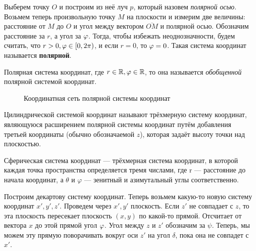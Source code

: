 	\Pagebreak

	\begin{Def}
		Выберем точку $O$ и построим из неё луч $p$, который назовем \textit{полярной осью}. Возьмем теперь произвольную точку $M$ на плоскости и измерим две величины:
		расстояние от $M$ до $O$ и угол между вектором $\overline{OM}$ и полярной осью. Обозначим расстояние за $r$, а угол за $\varphi$.
		Тогда, чтобы избежать неоднозначности, будем считать, что $r > 0, \varphi \in [0, 2\pi)$, и если $r = 0$, то $\varphi = 0$.    
		Такая система координат называется \textbf{полярной}.		

		\begin{figure*}[h]
			\centering
			\def\svgwidth{0.3\columnwidth}
			
		\end{figure*}
	\end{Def}

	\begin{Def}
		Полярная система координат, где $r \in \mathbb{R}, \varphi \in \mathbb{R}$, то она называется \textit{обобщенной} полярной системой координат.
	\end{Def}

	\begin{figure*}[h!]
		\centering
		\def\svgwidth{0.3\columnwidth}
		
		\caption{Координатная сеть полярной системы координат}
	\end{figure*}

	\begin{Def}
		Цилиндрической системой координат называют трёхмерную систему координат, являющуюся расширением полярной системы координат путём добавления третьей координаты (обычно обозначаемой ${\displaystyle z}$), которая задаёт высоту точки над плоскостью.
	\end{Def}

	\begin{Def}
		Сферическая система координат — трёхмерная система координат, в которой каждая точка пространства определяется тремя числами, где r — расстояние до начала координат, а $\theta$ и $\varphi$ — зенитный и азимутальный углы соответственно.
	\end{Def}


	Построим декартову систему координат. Теперь возьмем какую-то новую систему координат $x', y', z'$.
	Проведем через $x', y'$ плоскость. Если $z'$ не совпадает с $z$, то эта плоскость пересекает плоскость $(x, y)$ по какой-то прямой.
	Отсчитает от вектора $x$ до этой прямой угол $\varphi$. Угол между $z$ и $z'$ обозначим за $\psi$.
	Теперь, мы можем эту прямую поворачивать вокруг оси $z'$ на угол $\delta$, пока она не совпадет с $x'$.
	
